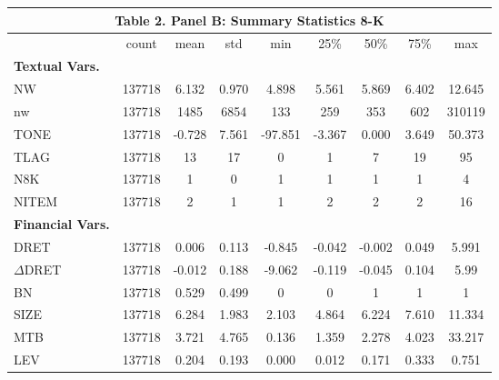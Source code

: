 \begin{table}[htbp] \label{T2PB}
  \centering
    \begin{tabular}{lcccccccc}
    \multicolumn{9}{c}{\textbf{Table 2. Panel B: Summary Statistics 8-K}} \\
    \midrule
      & count & mean & std & min & 25\% & 50\% & 75\% & max \\
    \midrule
    \textbf{Textual Vars.} &   &   &   &   &   &   &   &  \\
    NW & 137718 & 6.132 & 0.970 & 4.898 & 5.561 & 5.869 & 6.402 & 12.645 \\
    nw & 137718 & 1485 & 6854 & 133 & 259 & 353 & 602 & 310119 \\
    TONE & 137718 & -0.728 & 7.561 & -97.851 & -3.367 & 0.000 & 3.649 & 50.373 \\
    TLAG & 137718 & 13 & 17 & 0 & 1 & 7 & 19 & 95 \\
    N8K & 137718 & 1 & 0 & 1 & 1 & 1 & 1 & 4 \\
    NITEM & 137718 & 2 & 1 & 1 & 2 & 2 & 2 & 16 \\
  
    \textbf{Financial Vars.} &   &   &   &   &   &   &   &  \\
    DRET & 137718 & 0.006 & 0.113 & -0.845 & -0.042 & -0.002 & 0.049 & 5.991 \\
    $\Delta$DRET & 137718 & -0.012 & 0.188 & -9.062 & -0.119 & -0.045 & 0.104 & 5.99 \\
    BN & 137718 & 0.529 & 0.499 & 0 & 0 & 1 & 1 & 1 \\
    SIZE & 137718 & 6.284 & 1.983 & 2.103 & 4.864 & 6.224 & 7.610 & 11.334 \\
    MTB & 137718 & 3.721 & 4.765 & 0.136 & 1.359 & 2.278 & 4.023 & 33.217 \\
    LEV & 137718 & 0.204 & 0.193 & 0.000 & 0.012 & 0.171 & 0.333 & 0.751 \\
    \bottomrule
    \end{tabular}%
\end{table}%
